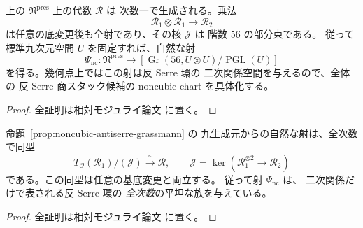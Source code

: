 \begin{proposition}[九生成元の相対二次関係と商スタックへの射]
\label{prop:noncubic-antiserre-grassmann}
上の $\mathfrak N^{\mathrm{pres}}$ 上の代数 $\mathcal R$ は
次数一で生成される。乗法
\[
 \mathcal R_1\otimes\mathcal R_1
    \longrightarrow\mathcal R_2
\]
は任意の底変更後も全射であり、その核 $\mathcal J$ は
階数 $56$ の部分束である。
従って標準九次元空間 $U$ を固定すれば、自然な射
\[
 \Psi_{\mathrm{nc}}:
 \mathfrak N^{\mathrm{pres}}
 \longrightarrow
 \left[\operatorname{Gr}(56,U\otimes U)/\operatorname{PGL}(U)\right]
 \tag{NC-Gr}\label{eq:noncubic-antiserre-grassmann}
\]
を得る。幾何点上ではこの射は反 Serre 環の
二次関係空間を与えるので、全体の
反 Serre 商スタック候補の noncubic chart を具体化する。
\end{proposition}
\begin{proof}
全証明は相対モジュライ論文 \cite[\texttt{noncubic_stack}]{QuadricModuli2026} に置く。
\end{proof}

\begin{corollary}
\label{cor:noncubic-relative-full-quadratic-presentation}
命題~\ref{prop:noncubic-antiserre-grassmann} の
九生成元からの自然な射は、全次数で同型
\[
 T_{\mathcal O}(\mathcal R_1)/(\mathcal J)
       \xrightarrow{\ \sim\ }\mathcal R,
 \qquad
 \mathcal J=\ker(\mathcal R_1^{\otimes2}\to\mathcal R_2)
 \tag{NC-quad}\label{eq:noncubic-relative-quadratic-presentation}
\]
である。この同型は任意の基底変更と両立する。
従って射 $\Psi_{\mathrm{nc}}$ は、
二次関係だけで表される反 Serre 環の
\emph{全次数}の平坦な族を与えている。
\end{corollary}
\begin{proof}
全証明は相対モジュライ論文 \cite[\texttt{noncubic_stack}]{QuadricModuli2026} に置く。
\end{proof}

